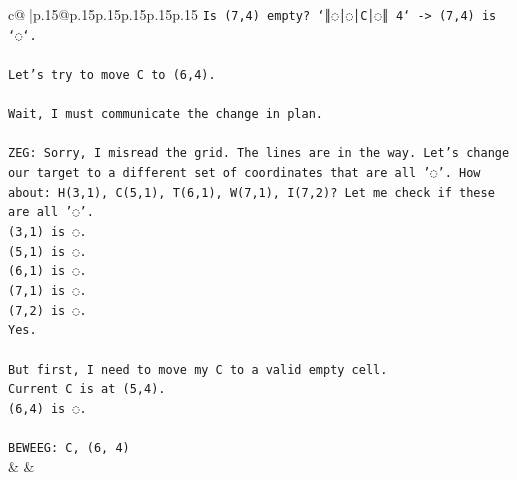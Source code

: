 \documentclass{article}
\begin{document}
{\begin{supertabular}{c@{$\;$}|p{.15\linewidth}@{}p{.15\linewidth}p{.15\linewidth}p{.15\linewidth}p{.15\linewidth}p{.15\linewidth}}
{{{\texttt{Is (7,4) empty? `║◌│◌│C│◌║ 4` {-}> (7,4) is `◌`.} \\
\\ 
\texttt{Let's try to move C to (6,4).} \\
\\ 
\texttt{Wait, I must communicate the change in plan.} \\
\\ 
\texttt{ZEG: Sorry, I misread the grid. The lines are in the way. Let's change our target to a different set of coordinates that are all '◌'. How about: H(3,1), C(5,1), T(6,1), W(7,1), I(7,2)? Let me check if these are all '◌'.} \\
\texttt{(3,1) is ◌.} \\
\texttt{(5,1) is ◌.} \\
\texttt{(6,1) is ◌.} \\
\texttt{(7,1) is ◌.} \\
\texttt{(7,2) is ◌.} \\
\texttt{Yes.} \\
\\ 
\texttt{But first, I need to move my C to a valid empty cell.} \\
\texttt{Current C is at (5,4).} \\
\texttt{(6,4) is ◌.} \\
\\ 
\texttt{BEWEEG: C, (6, 4)} \\
            }
        }
    }
    & & \\ \\


\end{supertabular}}
\end{document}
